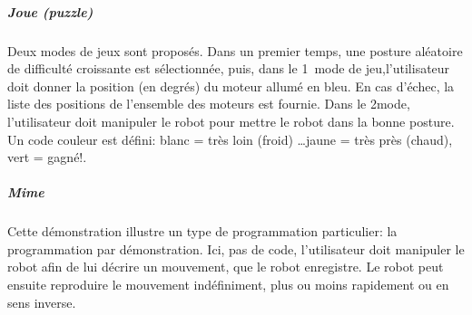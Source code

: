                 \subparagraph{Joue (puzzle)}
                    Deux modes de jeux sont proposés. Dans un premier temps, une posture aléatoire de difficulté croissante est sélectionnée, puis, dans le 1\ier~mode de jeu,l'utilisateur doit donner la position (en degrés) du moteur allumé en bleu. En cas d'échec, la liste des positions de l'ensemble des moteurs est fournie. Dans le 2\ieme mode, l'utilisateur doit manipuler le robot pour mettre le robot dans la bonne posture. Un code couleur est défini: blanc = très loin (froid) \dots jaune = très près (chaud), vert = gagné!.
                \subparagraph{Mime}
                    Cette démonstration illustre un type de programmation particulier: la programmation par démonstration. Ici, pas de code, l'utilisateur doit manipuler le robot afin de lui décrire un mouvement, que le robot enregistre. Le robot peut ensuite reproduire le mouvement indéfiniment, plus ou moins rapidement ou en sens inverse.\par%
